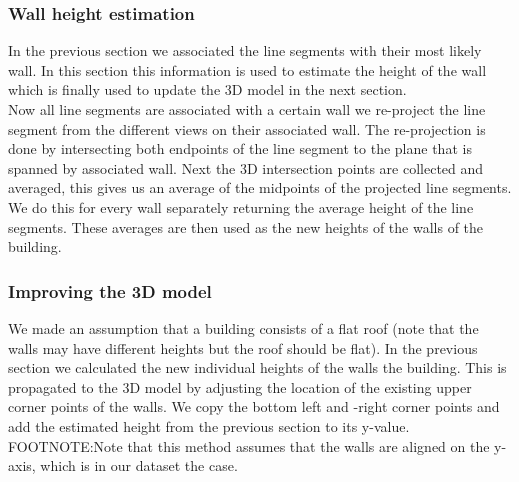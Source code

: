\documentclass[10pt]{article}
\begin{document}



	

\subsubsection{Wall height estimation}
  	In the previous section we associated the line segments with their most
	likely wall.
	In this section this information is used to estimate the height of the
	wall which is finally used to update the 3D model in the next section.
	\\
	Now all line segments are associated with a certain wall we re-project the
	line segment from the different views on their associated wall. The
	re-projection is done by intersecting both endpoints of the line segment to
	the plane that is spanned by associated wall.
	Next the 3D intersection points are collected and averaged, this gives us
	an average of the midpoints of the projected line segments. We do this for
	every wall separately returning the average height of the line segments.
	These averages are then used as the new heights of the walls of the building.

\subsubsection{Improving the 3D model} 
	We made an assumption that a building consists of a flat roof (note that the walls may have different heights but the roof should be flat).
	In the previous section we calculated the new individual heights of the walls the building. 
	This is propagated to the 3D model by adjusting the location of the existing upper corner points of the walls. We copy the bottom left and -right corner points and add the estimated height from the previous section to its y-value.
	FOOTNOTE:Note that this method assumes that the walls are aligned on the y-axis, which is in our dataset the case.
\end{document}
